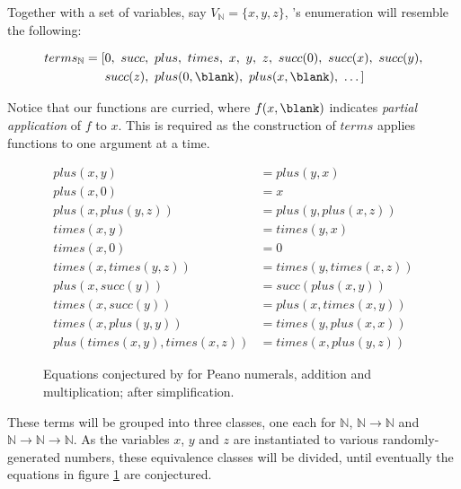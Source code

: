 Together with a set of variables, say $V_{\mathbb{N}} = \{x, y, z\}$, \qspec{}'s enumeration will resemble the following:

\begin{align*}
  terms_{\mathbb{N}} = [& 0,\ succ,\ plus,\ times,\ x,\ y,\ z,\ succ(0),\ succ(x),\ succ(y), \\
                     & succ(z),\ plus(0,\blank),\ plus(x, \blank),\ \dots ]
\end{align*}

Notice that our functions are curried, where $f(x,\blank)$ indicates \emph{partial application} of $f$ to $x$. This is required as the construction of $terms$ applies functions to one argument at a time.

\begin{figure}
  \begin{align*}
                        plus(x, y) &= plus(y, x)            \\
                        plus(x, 0) &= x                     \\
               plus(x, plus(y, z)) &= plus(y, plus(x, z))   \\
                       times(x, y) &= times(y, x)           \\
                       times(x, 0) &= 0                     \\
             times(x, times(y, z)) &= times(y, times(x, z)) \\
                  plus(x, succ(y)) &= succ(plus(x, y))      \\
                 times(x, succ(y)) &= plus(x, times(x, y))  \\
              times(x, plus(y, y)) &= times(y, plus(x, x))  \\
    plus(times(x, y), times(x, z)) &= times(x, plus(y, z))
  \end{align*}
  \caption{Equations conjectured by \qspec{} for Peano numerals, addition and multiplication; after simplification.}
  \label{fig:qspecresult}
\end{figure}

These terms will be grouped into three classes, one each for $\mathbb{N}$, $\mathbb{N} \rightarrow \mathbb{N}$ and $\mathbb{N} \rightarrow \mathbb{N} \rightarrow \mathbb{N}$. As the variables $x$, $y$ and $z$ are instantiated to various randomly-generated numbers, these equivalence classes will be divided, until eventually the equations in figure \ref{fig:qspecresult} are conjectured.

